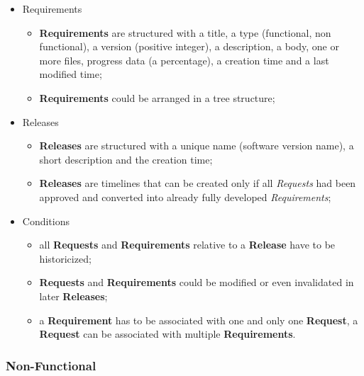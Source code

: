 \documentclass[12pt, a4paper]{report}
\begin{document}
\begin{itemize}
    \item Requirements
    \begin{itemize}
        \item \textbf{Requirements} are structured with a title, a type (functional, non functional), a version (positive integer),
            a description, a body, one or more files, progress data (a percentage), a creation time and a last modified time;
        \item \textbf{Requirements} could be arranged in a tree structure;
    \end{itemize}
    \item Releases
    \begin{itemize}
        \item \textbf{Releases} are structured with a unique name (software version name), a short description and the creation time;
        \item \textbf{Releases} are timelines that can be created only if all \emph{Requests} had been approved and converted into
            already fully developed \emph{Requirements};
    \end{itemize}
    \item Conditions
    \begin{itemize}
        \item all \textbf{Requests} and \textbf{Requirements} relative to a \textbf{Release} have to be historicized;
        \item \textbf{Requests} and \textbf{Requirements} could be modified or even invalidated in later \textbf{Releases};
        \item a \textbf{Requirement} has to be associated with one and only one \textbf{Request}, a \textbf{Request} can be associated
            with multiple \textbf{Requirements}.
    \end{itemize}
\end{itemize}

\subsubsection*{Non-Functional}
\end{document}
